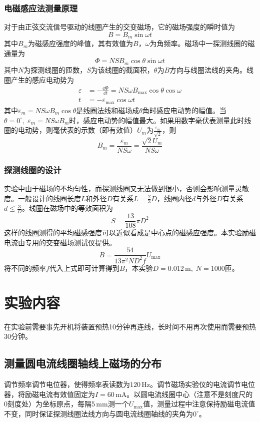 \documentclass[12pt]{article}
\begin{document}
\subsubsection{电磁感应法测量原理}
对于由正弦交流信号驱动的线圈产生的交变磁场，它的磁场强度的瞬时值为
\[
    B=B_m\sin\omega t
\]
其中$ B_m $为磁感应强度的峰值，其有效值为$ B $，$ \omega $为角频率。磁场中一探测线圈的磁通量为
\[
    \Phi=NSB_m\cos\theta\sin\omega t
\]
其中$ N $为探测线圈的匝数，$ S $为该线圈的截面积，$ \theta $为$ B $方向与线圈法线的夹角。线圈产生的感应电动势为
\[
    \begin{aligned}
        \varepsilon&=-\frac{\dd \Phi}{\dd t}=NS\omega B_\max\cos\theta\cos\omega \\
        t&=-\varepsilon_\max\cos\omega t
    \end{aligned}
\]
其中$ \varepsilon_m=NS\omega B_m\cos\theta $是线圈法线和磁场成$ \theta $角时感应电动势的幅值。当$ \theta=0^\circ,\;\varepsilon_m=NS\omega B_m $时，感应电动势的幅值最大。如果用数字毫伏表测量此时线圈的电动势，则毫伏表的示数（即有效值）$ U_m $为$ \frac{\varepsilon_m}{\sqrt 2} $，则
\[
    B_m=\frac{\varepsilon_m}{NS\omega}=\frac{\sqrt 2U_m}{NS\omega}
\]

\subsubsection{探测线圈的设计}
实验中由于磁场的不均匀性，而探测线圈又无法做到很小，否则会影响测量灵敏度。一般设计的线圈长度$ L $和外径$ D $有关系$ L=\frac23D $，线圈内径$ d $与外径$ D $有关系$ d\leq\frac3D $。线圈在磁场中的等效面积为
\[
    S=\frac{13}{108}\pi D^2
\]
这样的线圈测得的平均磁感强度可以近似看成是中心点的磁感应强度。本实验励磁电流由专用的交变磁场测试仪提供。
\[
    B=\frac{54}{13\pi^2ND^2f}U_\max
\]
将不同的频率$ f $代入上式即可计算得到$ B $，本实验$ D=0.012\,\mathrm m,\;N=1000 $匝。

\section{实验内容}
在实验前需要事先开机将装置预热10分钟再连线，长时间不用再次使用而需要预热30分钟。

\subsection{测量圆电流线圈轴线上磁场的分布}
调节频率调节电位器，使得频率表读数为$ 120\,\mathrm{Hz} $。调节磁场实验仪的电流调节电位器，将励磁电流有效值固定为$ I=60\,\mathrm{mA} $。以圆电流线圈中心（注意不是刻度尺的0刻度处）为坐标原点，每隔5\,mm测一个$ U_\max $值，测量过程中注意保持励磁电流值不变，同时保证探测线圈法线方向与圆电流线圈轴线的夹角为$ 0^\circ $。
\end{document}
